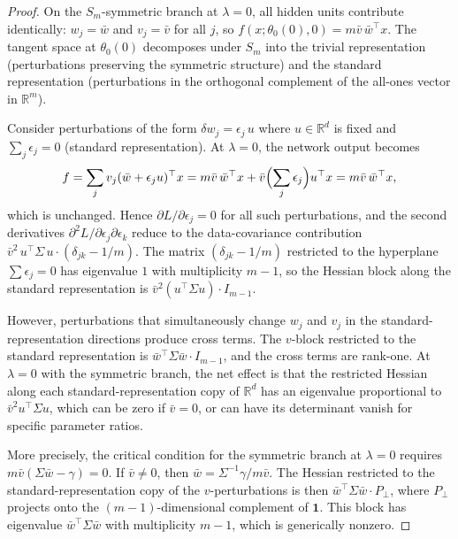 \documentclass[11pt, reqno]{amsart}
\theoremstyle{plain}
\theoremstyle{definition}
\theoremstyle{remark}
\begin{document}
\begin{proof}
On the $S_m$-symmetric branch at $\lambda=0$, all hidden units contribute identically: $w_j=\bar{w}$ and $v_j=\bar{v}$ for all $j$, so $f(x;\theta_0(0),0)=m\bar{v}\,\bar{w}^\top x$.  The tangent space at $\theta_0(0)$ decomposes under $S_m$ into the trivial representation (perturbations preserving the symmetric structure) and the standard representation (perturbations in the orthogonal complement of the all-ones vector in $\mathbb R^m$).

Consider perturbations of the form $\delta w_j = \epsilon_j \,u$ where $u\in\mathbb R^d$ is fixed and $\sum_j\epsilon_j=0$ (standard representation). At $\lambda=0$, the network output becomes
\begin{equation}
  f=\sum_j v_j(\bar{w}+\epsilon_j u)^\top x = m\bar{v}\,\bar{w}^\top x + \bar{v}\Bigl(\sum_j \epsilon_j\Bigr)u^\top x = m\bar{v}\,\bar{w}^\top x,
\end{equation}
which is unchanged. Hence $\partial L/\partial \epsilon_j=0$ for all such perturbations, and the second derivatives $\partial^2 L/\partial\epsilon_j\partial\epsilon_k$ reduce to the data-covariance contribution $\bar{v}^2\,u^\top \Sigma\, u\cdot(\delta_{jk}-1/m)$. The matrix $(\delta_{jk}-1/m)$ restricted to the hyperplane $\sum\epsilon_j=0$ has eigenvalue $1$ with multiplicity $m-1$, so the Hessian block along the standard representation is $\bar{v}^2(u^\top\Sigma u) \cdot I_{m-1}$.

However, perturbations that simultaneously change $w_j$ and $v_j$ in the standard-representation directions produce cross terms. The $v$-block restricted to the standard representation is $\bar{w}^\top\Sigma\bar{w}\cdot I_{m-1}$, and the cross terms are rank-one. At $\lambda=0$ with the symmetric branch, the net effect is that the restricted Hessian along each standard-representation copy of $\mathbb R^d$ has an eigenvalue proportional to $\bar{v}^2 u^\top\Sigma u$, which can be zero if $\bar{v}=0$, or can have its determinant vanish for specific parameter ratios.

More precisely, the critical condition for the symmetric branch at $\lambda=0$ requires $m\bar{v}(\Sigma\bar{w}-\gamma)=0$. If $\bar{v}\neq 0$, then $\bar{w}=\Sigma^{-1}\gamma/m\bar{v}$. The Hessian restricted to the standard-representation copy of the $v$-perturbations is then $\bar{w}^\top\Sigma\bar{w} \cdot P_\perp$, where $P_\perp$ projects onto the $(m-1)$-dimensional complement of $\mathbf{1}$. This block has eigenvalue $\bar{w}^\top\Sigma\bar{w}$ with multiplicity $m-1$, which is generically nonzero.


\end{proof}
\end{document}
